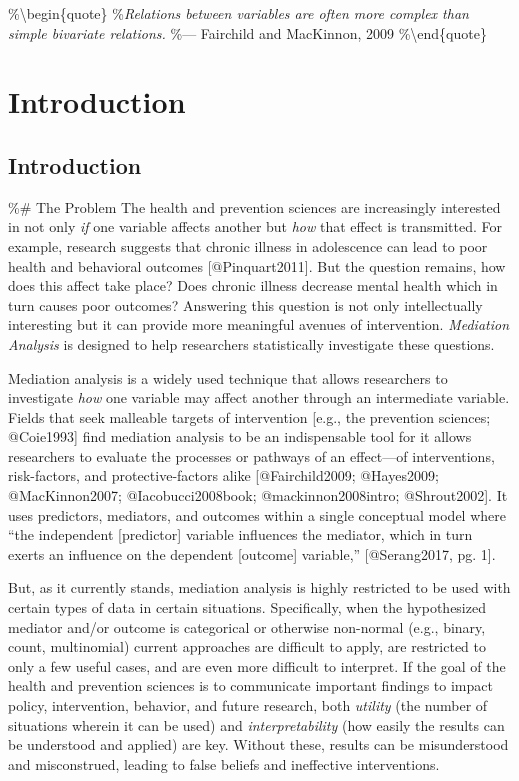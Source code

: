 \documentclass[]{article}
\title{}
\author{}
\date{}
\begin{document}
\%\textbackslash{}begin\{quote\}
\%\emph{Relations between variables are often more complex than simple bivariate relations.}
\%--- Fairchild and MacKinnon, 2009 \%\textbackslash{}end\{quote\}

\doublespacing

\section{Introduction}
\label{sec:Introduction}\subsection{Introduction}

\%\# The Problem The health and prevention sciences are increasingly
interested in not only \emph{if} one variable affects another but
\emph{how} that effect is transmitted. For example, research suggests
that chronic illness in adolescence can lead to poor health and
behavioral outcomes {[}@Pinquart2011{]}. But the question remains, how
does this affect take place? Does chronic illness decrease mental health
which in turn causes poor outcomes? Answering this question is not only
intellectually interesting but it can provide more meaningful avenues of
intervention. \emph{Mediation Analysis} is designed to help researchers
statistically investigate these questions.

Mediation analysis is a widely used technique that allows researchers to
investigate \emph{how} one variable may affect another through an
intermediate variable. Fields that seek malleable targets of
intervention {[}e.g., the prevention sciences; @Coie1993{]} find
mediation analysis to be an indispensable tool for it allows researchers
to evaluate the processes or pathways of an effect---of interventions,
risk-factors, and protective-factors alike {[}@Fairchild2009;
@Hayes2009; @MacKinnon2007; @Iacobucci2008book; @mackinnon2008intro;
@Shrout2002{]}. It uses predictors, mediators, and outcomes within a
single conceptual model where ``the independent {[}predictor{]} variable
influences the mediator, which in turn exerts an influence on the
dependent {[}outcome{]} variable,'' {[}@Serang2017, pg. 1{]}.

But, as it currently stands, mediation analysis is highly restricted to
be used with certain types of data in certain situations. Specifically,
when the hypothesized mediator and/or outcome is categorical or
otherwise non-normal (e.g., binary, count, multinomial) current
approaches are difficult to apply, are restricted to only a few useful
cases, and are even more difficult to interpret. If the goal of the
health and prevention sciences is to communicate important findings to
impact policy, intervention, behavior, and future research, both
\emph{utility} (the number of situations wherein it can be used) and
\emph{interpretability} (how easily the results can be understood and
applied) are key. Without these, results can be misunderstood and
misconstrued, leading to false beliefs and ineffective interventions.
\end{document}
